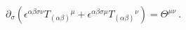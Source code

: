 \begin{equation}
\partial _{\sigma }\left( \epsilon ^{\alpha \beta \sigma \nu }T_{(\alpha
\beta )}{}^{\mu }+\epsilon ^{\alpha \beta \sigma \mu }T_{(\alpha \beta
)}{}^{\nu }\right) =\Theta ^{\mu \nu }\ .  \label{aga}
\end{equation}%
